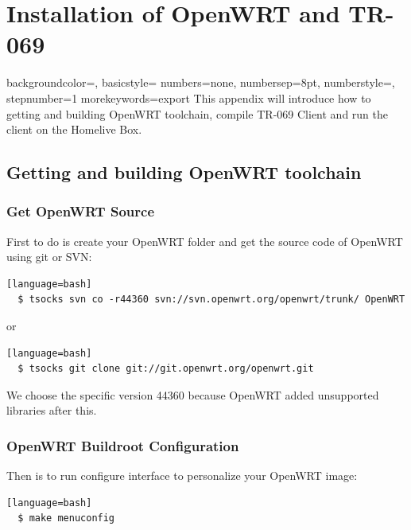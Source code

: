 
\chapter{Installation of OpenWRT and TR-069} %

\label{AppendixA} %


{
    backgroundcolor=\color{black},
    basicstyle=\scriptsize\color{white}\ttfamily
    numbers=none,
    numbersep=8pt,                   %
    numberstyle=\tiny\color{white}, %
    stepnumber=1                    %
}
{
  morekeywords={export}
}
This appendix will introduce how to getting and building OpenWRT toolchain, compile TR-069 Client and run the client on the Homelive Box.
\section{Getting and building OpenWRT toolchain}

\subsection{Get OpenWRT Source}
First to do is create your OpenWRT folder and get the source code of OpenWRT using git or SVN:
\begin{lstlisting}[style=DOS][language=bash]
  $ tsocks svn co -r44360 svn://svn.openwrt.org/openwrt/trunk/ OpenWRT
\end{lstlisting}
or
\begin{lstlisting}[style=DOS][language=bash]
  $ tsocks git clone git://git.openwrt.org/openwrt.git
\end{lstlisting}

We choose the specific version 44360 because OpenWRT added unsupported libraries after this.

\subsection{OpenWRT Buildroot Configuration}
Then is to run configure interface to personalize your OpenWRT image:
\begin{lstlisting}[style=DOS][language=bash]
  $ make menuconfig
\end{lstlisting}

